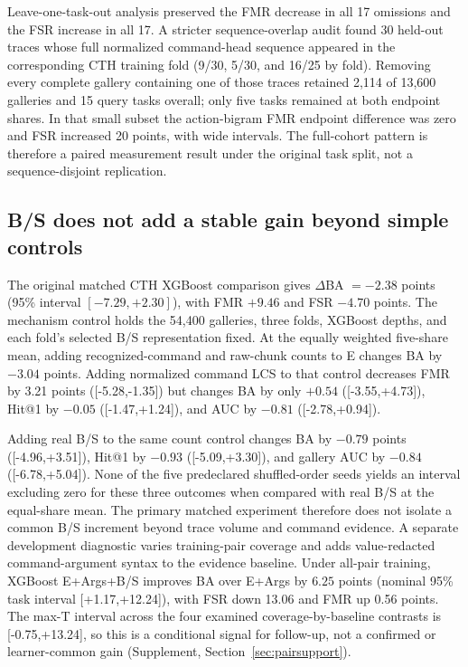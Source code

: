 \documentclass[10pt]{article}
\begin{document}
Leave-one-task-out analysis preserved the FMR decrease in all 17 omissions and the FSR increase in all 17. A stricter sequence-overlap audit found 30 held-out traces whose full normalized command-head sequence appeared in the corresponding CTH training fold (9/30, 5/30, and 16/25 by fold). Removing every complete gallery containing one of those traces retained 2,114 of 13,600 galleries and 15 query tasks overall; only five tasks remained at both endpoint shares. In that small subset the action-bigram FMR endpoint difference was zero and FSR increased 20 points, with wide intervals. The full-cohort pattern is therefore a paired measurement result under the original task split, not a sequence-disjoint replication.

\subsection{B/S does not add a stable gain beyond simple controls}
The original matched CTH XGBoost comparison gives $\Delta$BA $=-2.38$ points (95\% interval $[-7.29,+2.30]$), with FMR $+9.46$ and FSR $-4.70$ points. The mechanism control holds the 54,400 galleries, three folds, XGBoost depths, and each fold's selected B/S representation fixed. At the equally weighted five-share mean, adding recognized-command and raw-chunk counts to E changes BA by $-3.04$ points. Adding normalized command LCS to that control decreases FMR by 3.21 points ([-5.28,-1.35]) but changes BA by only $+0.54$ ([-3.55,+4.73]), Hit@1 by $-0.05$ ([-1.47,+1.24]), and AUC by $-0.81$ ([-2.78,+0.94]).

Adding real B/S to the same count control changes BA by $-0.79$ points ([-4.96,+3.51]), Hit@1 by $-0.93$ ([-5.09,+3.30]), and gallery AUC by $-0.84$ ([-6.78,+5.04]). None of the five predeclared shuffled-order seeds yields an interval excluding zero for these three outcomes when compared with real B/S at the equal-share mean. The primary matched experiment therefore does not isolate a common B/S increment beyond trace volume and command evidence. A separate development diagnostic varies training-pair coverage and adds value-redacted command-argument syntax to the evidence baseline. Under all-pair training, XGBoost E+Args+B/S improves BA over E+Args by $6.25$ points (nominal 95\% task interval [+1.17,+12.24]), with FSR down 13.06 and FMR up 0.56 points. The max-T interval across the four examined coverage-by-baseline contrasts is [-0.75,+13.24], so this is a conditional signal for follow-up, not a confirmed or learner-common gain (Supplement, Section~\ref{sec:pairsupport}).
\end{document}
